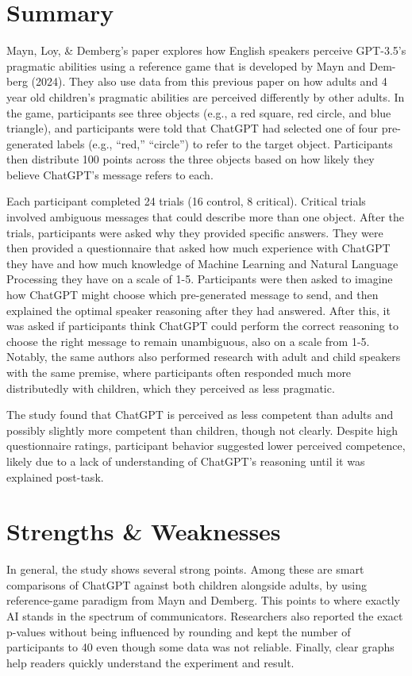 \documentclass[12pt]{article}
\begin{document}
\section{Summary}
Mayn, Loy, \& Demberg's paper explores how English speakers perceive GPT-3.5’s pragmatic abilities using a reference game that is developed by Mayn and Dem-berg (2024). They also use data from this previous paper on how adults and 4 year old children's pragmatic abilities are perceived differently by other adults. In the game, participants see three objects (e.g., a red square, red circle, and blue triangle), and participants were told that ChatGPT had selected one of four pre-generated labels (e.g., “red,” “circle”) to refer to the target object. Participants then distribute 100 points across the three objects based on how likely they believe ChatGPT’s message refers to each.

Each participant completed 24 trials (16 control, 8 critical). Critical trials involved ambiguous messages that could describe more than one object. After the trials, participants were asked why they provided specific answers. They were then provided a questionnaire that asked how much experience with ChatGPT they have and how much knowledge of Machine Learning and Natural Language Processing they have on a scale of 1-5. Participants were then asked to imagine how ChatGPT might choose which pre-generated message to send, and then explained the optimal speaker reasoning after they had answered. After this, it was asked if participants think ChatGPT could perform the correct reasoning to choose the right message to remain unambiguous, also on a scale from 1-5. Notably, the same authors also performed research with adult and child speakers with the same premise, where participants often responded much more distributedly with children, which they perceived as less pragmatic.


The study found that ChatGPT is perceived as less competent than adults and possibly slightly more competent than children, though not clearly. Despite high questionnaire ratings, participant behavior suggested lower perceived competence, likely due to a lack of understanding of ChatGPT’s reasoning until it was explained post-task.


\section{Strengths \& Weaknesses}
In general, the study shows several strong points. Among these are smart comparisons of ChatGPT against both children alongside adults, by using reference-game paradigm from Mayn and Demberg. This points to where exactly AI stands in the spectrum of communicators. Researchers also reported the exact p-values without being influenced by rounding and kept the number of participants to 40 even though some data was not reliable. Finally, clear graphs help readers quickly understand the experiment and result.
\end{document}
